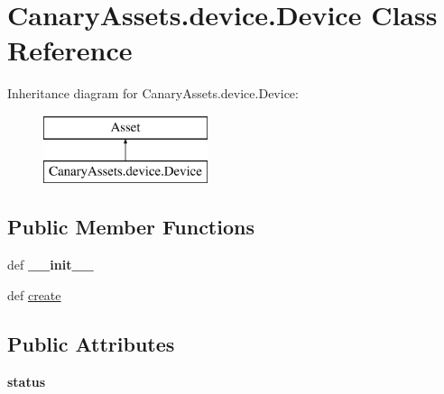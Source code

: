 \hypertarget{class_canary_assets_1_1device_1_1_device}{\section{Canary\-Assets.\-device.\-Device Class Reference}
\label{class_canary_assets_1_1device_1_1_device}
}
Inheritance diagram for Canary\-Assets.\-device.\-Device\-:\begin{figure}[H]
\begin{center}
\leavevmode
\includegraphics[height=2.000000cm]{class_canary_assets_1_1device_1_1_device}
\end{center}
\end{figure}
\subsection*{Public Member Functions}
\begin{DoxyCompactItemize}
\item 
\hypertarget{class_canary_assets_1_1device_1_1_device_a10e922bd413076872d987cef9668a0ac}{def {\bfseries \-\_\-\-\_\-init\-\_\-\-\_\-}}\label{class_canary_assets_1_1device_1_1_device_a10e922bd413076872d987cef9668a0ac}

\item 
def \hyperlink{class_canary_assets_1_1device_1_1_device_a99f64a969748c85c02795246a84b9c23}{create}
\end{DoxyCompactItemize}
\subsection*{Public Attributes}
\begin{DoxyCompactItemize}
\item 
\hypertarget{class_canary_assets_1_1device_1_1_device_a0b766569683a4c4827d17b5f1a860a92}{{\bfseries status}}\label{class_canary_assets_1_1device_1_1_device_a0b766569683a4c4827d17b5f1a860a92}

\end{DoxyCompactItemize}


